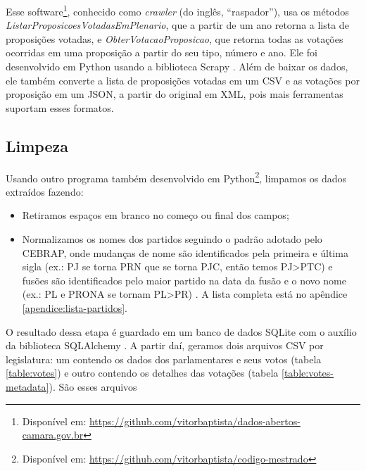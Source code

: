 \documentclass[a4paper,titlepage]{ppgi}\usepackage[]{graphicx}\usepackage[]{color}
\begin{document}
Esse software\footnote{Disponível em:
\url{https://github.com/vitorbaptista/dados-abertos-camara.gov.br}}, conhecido
como \emph{crawler} (do inglês, ``raspador''), usa os métodos
\emph{ListarProposicoesVotadasEmPlenario}, que a partir de um ano retorna a
lista de proposições votadas, e \emph{ObterVotacaoProposicao}, que retorna
todas as votações ocorridas em uma proposição a partir do seu tipo, número e
ano. Ele foi desenvolvido em Python usando a biblioteca Scrapy
\cite{Python276,Scrapy}. Além de baixar os dados, ele também converte a lista
de proposições votadas em um \gls{CSV} e as votações por proposição em um
\gls{JSON}, a partir do original em \gls{XML}, pois mais ferramentas suportam
esses formatos.

\subsection{Limpeza}

Usando outro programa também desenvolvido em Python\footnote{Disponível em:
\url{https://github.com/vitorbaptista/codigo-mestrado}}, limpamos os dados
extraídos fazendo:

\begin{itemize}
  \item Retiramos espaços em branco no começo ou final dos campos;
  \item Normalizamos os nomes dos partidos seguindo o padrão adotado pelo
\gls{CEBRAP}, onde mudanças de nome são identificados pela primeira e última
sigla (ex.: PJ se torna PRN que se torna PJC, então temos PJ>PTC) e fusões são
identificados pelo maior partido na data da fusão e o novo nome (ex.: PL e
PRONA se tornam PL>PR) \cite{Freitas2008}. A lista completa está no apêndice
\ref{apendice:lista-partidos}.
\end{itemize}

O resultado dessa etapa é guardado em um banco de dados SQLite com o auxílio da
biblioteca SQLAlchemy \cite{SQLite3,SQLAlchemy}. A partir daí, geramos dois
arquivos \gls{CSV} por legislatura: um contendo os dados dos parlamentares e
seus votos (tabela \ref{table:votes}) e outro contendo os detalhes das votações
(tabela \ref{table:votes-metadata}). São esses arquivos 
\end{document}
